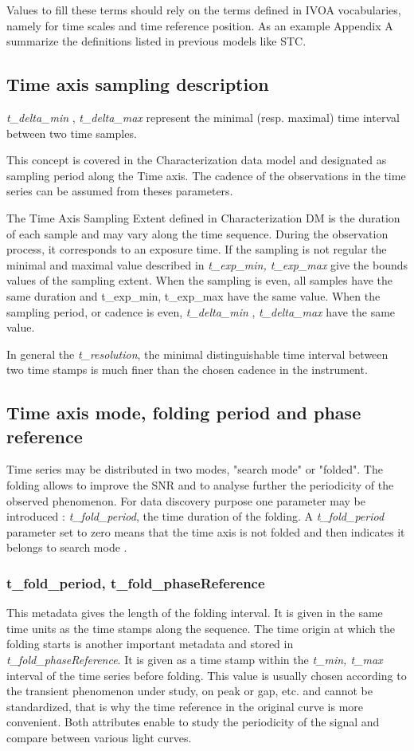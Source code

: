 \documentclass[11pt,a4paper]{ivoa}
\begin{document}
Values to fill these terms should rely on the terms defined in IVOA vocabularies, namely for  time scales and time reference position.
As an example Appendix A summarize the definitions listed in previous models like STC.

\subsection{Time axis sampling description}
\emph{t\_delta\_min }, \emph{t\_delta\_max}  represent the minimal (resp. maximal) time interval between two time samples.

This concept is covered in the Characterization data model \citep{2008ivoa.spec.0325L} and designated as sampling period along the Time axis.
The cadence of the observations in the time series  can be assumed from theses parameters.

 The Time Axis Sampling Extent defined in Characterization DM is the duration of each sample and may vary along the time sequence.
 During the observation process, it corresponds to an exposure time.
 If the sampling is not regular the minimal and maximal value described in \emph{ t\_exp\_min, t\_exp\_max} give the bounds values of the sampling extent.
When the sampling  is even, all samples have the same duration and  t\_exp\_min, t\_exp\_max have the same value.
When the sampling period, or cadence  is even, \emph{t\_delta\_min }, \emph{t\_delta\_max} have the same value.

In general the \emph{t\_resolution}, the minimal distinguishable time interval between two time stamps is  much finer than the chosen cadence in the instrument.  %

\subsection{Time axis mode, folding period  and phase reference}
Time series may be distributed in two modes, "search mode" or "folded".
The folding allows to improve the SNR and to analyse further the periodicity of the observed phenomenon.
For data discovery  purpose one parameter may be introduced : \emph{t\_fold\_period}, the time duration of the folding.
A \emph{t\_fold\_period} parameter set to zero means that the time axis is not folded  and then indicates it belongs to search mode .

\subsubsection{ t\_fold\_period,  t\_fold\_phaseReference}
This metadata gives the length  of the folding interval. It is given in the same time units as the time stamps along the sequence.
The time origin at which the folding starts is another important metadata and stored in
\emph{t\_fold\_phaseReference}. It is given as a time stamp within the \emph{t\_min, t\_max} interval of the time series before folding.
This value is usually chosen according to the transient phenomenon under study, on peak or gap, etc.  and cannot be standardized, that is why the time reference in the original curve is more convenient.
Both attributes enable to study the periodicity of the signal and compare between various light curves.
\end{document}
